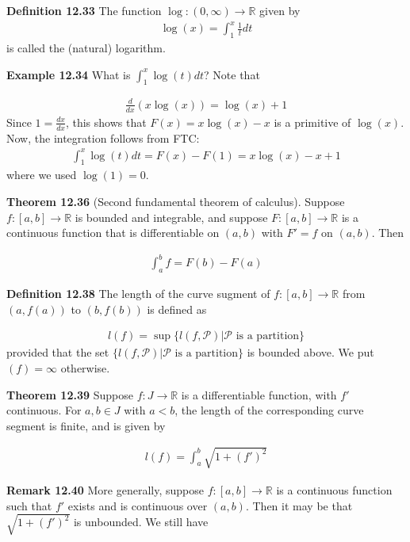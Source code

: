 \documentclass[11pt]{article}
\begin{document}
\textbf{Definition 12.33} The function $\log: (0, \infty) \to \mathbb{R}$ given by 
\begin{align*}
    \log(x) = \int_1^x \frac{1}{t}dt
\end{align*}
is called the (natural) logarithm.

\textbf{Example 12.34} What is $\int_1^x \log(t) dt$? Note that 

\begin{align*}
    \frac{d}{dx}(x \log(x)) = \log(x) + 1
\end{align*}
Since $1 = \frac{dx}{dx}$, this shows that $F(x) = x\log(x) - x$ is a primitive of $\log(x)$. Now, the integration follows from FTC:
\begin{align*}
    \int_1^x \log(t) dt = F(x) - F(1) = x\log(x) - x + 1
\end{align*}
where we used $\log(1) = 0$. 

\textbf{Theorem 12.36} (Second fundamental theorem of calculus). Suppose $f: [a,b] \to \mathbb{R}$ is bounded and integrable, and suppose $F: [a,b] \to \mathbb{R}$ is a continuous function that is differentiable on $(a,b)$ with $F' = f$ on $(a,b)$. Then 

\begin{align*}
    \int_a^b f = F(b) - F(a) 
\end{align*}

\textbf{Definition 12.38} The length of the curve sugment of $f: [a,b] \to \mathbb{R}$ from $(a, f(a))$ to $(b, f(b))$ is defined as 

\begin{align*}
    l(f) = \sup\{l(f, \mathcal{P})|\mathcal{P} \text{ is a partition} \}
\end{align*}
provided that the set $\{l(f, \mathcal{P})|\mathcal{P} \text{ is a partition} \}$ is bounded above. We put $(f) = \infty$ otherwise.

\textbf{Theorem 12.39} Suppose $f: J \to \mathbb{R}$ is a differentiable function, with $f'$ continuous. For $a,b \in J$ with $a < b$, the length of the corresponding curve segment is finite, and is given by 

\begin{align*}
    l(f) = \int_a^b \sqrt{1 + (f')^2 }
\end{align*}

\textbf{Remark 12.40} More generally, suppose $f: [a,b] \to \mathbb{R}$ is a continuous function such that $f'$ exists and is continuous over $(a,b)$. Then it may be that $\sqrt{1+(f')^2}$ is unbounded. We still have
\end{document}
